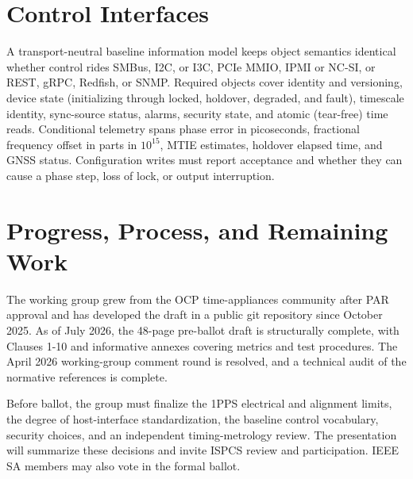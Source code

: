\documentclass[
  conference,
  a4paper]{IEEEtran}
\begin{document}
\section{Control Interfaces}\label{control-interfaces}

A transport-neutral baseline information model keeps object semantics
identical whether control rides SMBus, I2C, or I3C, PCIe MMIO, IPMI or
NC-SI, or REST, gRPC, Redfish, or SNMP. Required objects cover identity
and versioning, device state (initializing through locked, holdover,
degraded, and fault), timescale identity, sync-source status, alarms,
security state, and atomic (tear-free) time reads. Conditional telemetry
spans phase error in picoseconds, fractional frequency offset in parts
in \(10^{15}\), MTIE estimates, holdover elapsed time, and GNSS status.
Configuration writes must report acceptance and whether they can cause a
phase step, loss of lock, or output interruption.

\section{Progress, Process, and Remaining
Work}\label{progress-process-and-remaining-work}

The working group grew from the OCP time-appliances community after PAR
approval and has developed the draft in a public git repository
\citep{p3335repo} since October 2025. As of July 2026, the 48-page
pre-ballot draft is structurally complete, with Clauses 1-10 and
informative annexes covering metrics and test procedures. The April 2026
working-group comment round is resolved, and a technical audit of the
normative references is complete.

Before ballot, the group must finalize the 1PPS electrical and alignment
limits, the degree of host-interface standardization, the baseline
control vocabulary, security choices, and an independent
timing-metrology review. The presentation will summarize these decisions
and invite ISPCS review and participation. IEEE SA members may also vote
in the formal ballot.



\end{document}
